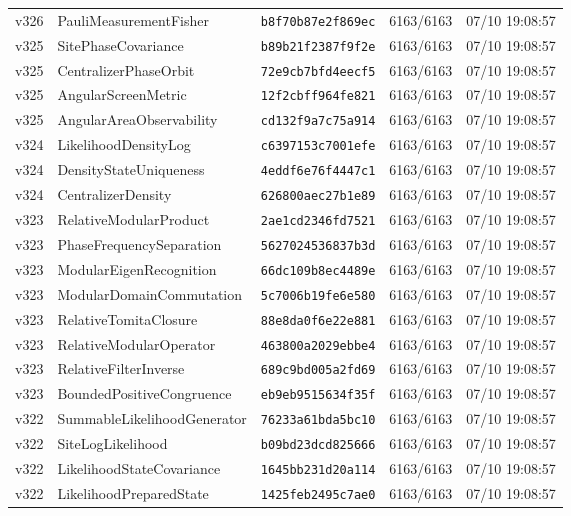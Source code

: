 \documentclass[11pt]{article}
\theoremstyle{definition}\newtheorem{deriv}{Derivation}
\begin{document}
{\begin{longtable}{@{}lllll@{}}
v326 & PauliMeasurementFisher & \texttt{b8f70b87e2f869ec} & 6163/6163 & 07/10 19:08:57 \\
v325 & SitePhaseCovariance & \texttt{b89b21f2387f9f2e} & 6163/6163 & 07/10 19:08:57 \\
v325 & CentralizerPhaseOrbit & \texttt{72e9cb7bfd4eecf5} & 6163/6163 & 07/10 19:08:57 \\
v325 & AngularScreenMetric & \texttt{12f2cbff964fe821} & 6163/6163 & 07/10 19:08:57 \\
v325 & AngularAreaObservability & \texttt{cd132f9a7c75a914} & 6163/6163 & 07/10 19:08:57 \\
v324 & LikelihoodDensityLog & \texttt{c6397153c7001efe} & 6163/6163 & 07/10 19:08:57 \\
v324 & DensityStateUniqueness & \texttt{4eddf6e76f4447c1} & 6163/6163 & 07/10 19:08:57 \\
v324 & CentralizerDensity & \texttt{626800aec27b1e89} & 6163/6163 & 07/10 19:08:57 \\
v323 & RelativeModularProduct & \texttt{2ae1cd2346fd7521} & 6163/6163 & 07/10 19:08:57 \\
v323 & PhaseFrequencySeparation & \texttt{5627024536837b3d} & 6163/6163 & 07/10 19:08:57 \\
v323 & ModularEigenRecognition & \texttt{66dc109b8ec4489e} & 6163/6163 & 07/10 19:08:57 \\
v323 & ModularDomainCommutation & \texttt{5c7006b19fe6e580} & 6163/6163 & 07/10 19:08:57 \\
v323 & RelativeTomitaClosure & \texttt{88e8da0f6e22e881} & 6163/6163 & 07/10 19:08:57 \\
v323 & RelativeModularOperator & \texttt{463800a2029ebbe4} & 6163/6163 & 07/10 19:08:57 \\
v323 & RelativeFilterInverse & \texttt{689c9bd005a2fd69} & 6163/6163 & 07/10 19:08:57 \\
v323 & BoundedPositiveCongruence & \texttt{eb9eb9515634f35f} & 6163/6163 & 07/10 19:08:57 \\
v322 & SummableLikelihoodGenerator & \texttt{76233a61bda5bc10} & 6163/6163 & 07/10 19:08:57 \\
v322 & SiteLogLikelihood & \texttt{b09bd23dcd825666} & 6163/6163 & 07/10 19:08:57 \\
v322 & LikelihoodStateCovariance & \texttt{1645bb231d20a114} & 6163/6163 & 07/10 19:08:57 \\
v322 & LikelihoodPreparedState & \texttt{1425feb2495c7ae0} & 6163/6163 & 07/10 19:08:57 \\

\end{longtable}}
\end{document}
